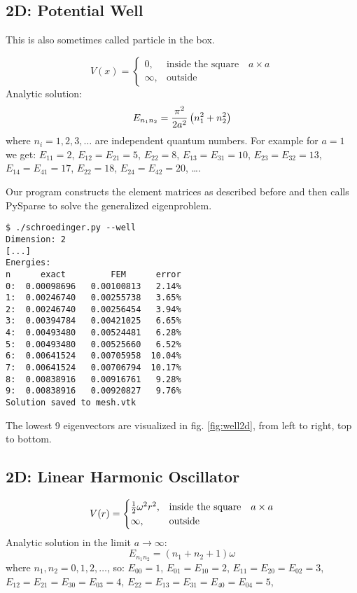 \subsection{2D: Potential Well}

This is also sometimes called particle in the box.

$$V(x)=\begin{cases}0,&\text{inside the square}\quad a\times a \\
\infty, & \text{outside}\end{cases}$$
Analytic solution:
$$E_{n_1n_2}={\pi^2\over2a^2}\left(n_1^2 + n_2^2\right)$$
where $n_i = 1, 2, 3, \dots$ are independent quantum numbers.
For example for $a=1$ we get:
$E_{11}=2$,
$E_{12}=E_{21}=5$,
$E_{22}=8$,
$E_{13}=E_{31}=10$,
$E_{23}=E_{32}=13$,
$E_{14}=E_{41}=17$,
$E_{22}=18$,
$E_{24}=E_{42}=20$, \dots.

Our program constructs the element matrices as described before and then calls
PySparse\cite{geus} to solve the generalized eigenproblem.


\begin{lstlisting}
$ ./schroedinger.py --well
Dimension: 2
[...]
Energies:
n      exact         FEM      error
0:  0.00098696   0.00100813   2.14%
1:  0.00246740   0.00255738   3.65%
2:  0.00246740   0.00256454   3.94%
3:  0.00394784   0.00421025   6.65%
4:  0.00493480   0.00524481   6.28%
5:  0.00493480   0.00525660   6.52%
6:  0.00641524   0.00705958  10.04%
7:  0.00641524   0.00706794  10.17%
8:  0.00838916   0.00916761   9.28%
9:  0.00838916   0.00920827   9.76%
Solution saved to mesh.vtk
\end{lstlisting}

The lowest 9 eigenvectors are visualized in fig. \ref{fig:well2d}, from left to
right, top to bottom.




\subsection{2D: Linear Harmonic Oscillator}

$$V(r)=\begin{cases}{\textstyle{1\over2}}\omega^2r^2,&\text{inside the square}\quad a\times a \\
\infty, & \text{outside}\end{cases}$$
Analytic solution in the limit $a\to\infty$:
$$E_{n_1n_2}=\left(n_1+n_2+1\right)\omega$$
where $n_1, n_2 = 0, 1, 2, \dots$, so:
$E_{00} = 1$,
$E_{01} = E_{10} = 2$,
$E_{11} = E_{20} = E_{02} = 3$,
$E_{12} = E_{21} = E_{30} = E_{03} = 4$,
$E_{22} = E_{13} = E_{31} = E_{40} = E_{04} = 5$,

